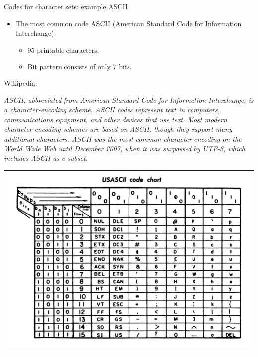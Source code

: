 \documentclass[11pt,compress,t,notes=noshow, xcolor=table]{beamer}
\begin{document}
\begin{vbframe}{Codes for character sets: example ASCII}

\begin{itemize}
\item The most common code  ASCII (American Standard Code for Information Interchange):
  \begin{itemize}
    \item 95 printable characters.
    \item Bit pattern consists of only $7$ bits.
  \end{itemize}
\end{itemize}

\lz

Wikipedia:

\emph{ASCII, abbreviated from American Standard Code for Information Interchange, is a character-encoding scheme.
ASCII codes represent text in computers, communications equipment, and other devices that use text.
Most modern character-encoding schemes are based on ASCII, though they support many additional characters.
ASCII was the most common character encoding on the World Wide Web until December 2007, when it was surpassed by UTF-8, which includes ASCII as a subset.}

\framebreak

\begin{center}
\begin{tabular}{l}
\includegraphics[width=0.43\paperwidth]{figure_man/ascii_code_chart}
\end{tabular}


\end{center}
\end{vbframe}
\end{document}
